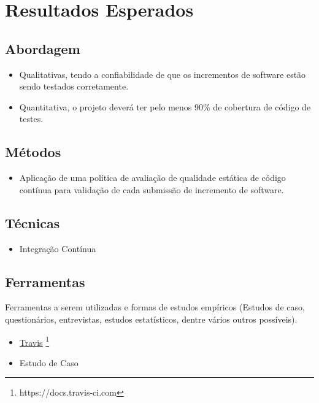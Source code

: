 \section{Resultados Esperados}
\subsection{Abordagem}
\begin{itemize}
    \item Qualitativas, tendo a confiabilidade de que os incrementos de software estão sendo testados corretamente.
    \item Quantitativa, o projeto deverá ter pelo menos 90\% de cobertura de código de testes.
\end{itemize}

\subsection{Métodos}
\begin{itemize}
    \item Aplicação de uma política de avaliação de qualidade estática de código contínua para validação de cada submissão de incremento de software.
\end{itemize}

\subsection{Técnicas}
\begin{itemize}
    \item Integração Contínua
\end{itemize}

\subsection{Ferramentas}
Ferramentas a serem utilizadas e formas de estudos empíricos (Estudos de caso, questionários, entrevistas, estudos estatísticos, dentre vários outros possíveis).
\begin{itemize}
    \item \href{https://docs.travis-ci.com}{Travis}%
    \footnote{https://docs.travis-ci.com}
    \item Estudo de Caso
\end{itemize}

